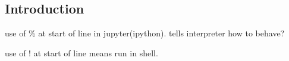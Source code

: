 
\subsection{Introduction}

use of \% at start of line in jupyter(ipython). tells interpreter how to behave?

use of ! at start of line means run in shell.

